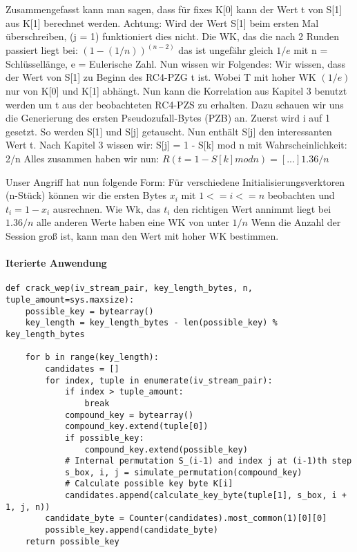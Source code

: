 \documentclass[10pt,a4paper]{article}
\begin{document}
Zusammengefasst kann man sagen, dass für fixes K[0] kann der Wert t von S[1] aus K[1] berechnet werden. Achtung: Wird der Wert S[1] beim ersten Mal überschreiben, (j = 1) funktioniert dies nicht. Die WK, das die nach 2 Runden passiert liegt bei:
$(1- (1/n))^(n-2)$ das ist ungefähr gleich $1/e$ mit n = Schlüssellänge, e = Eulerische Zahl. Nun wissen wir Folgendes: Wir wissen, dass der Wert von S[1] zu Beginn des RC4-PZG t ist. Wobei T mit hoher WK $(1/e)$ nur von K[0] und K[1] abhängt. Nun kann die Korrelation aus Kapitel 3 benutzt werden um t aus der beobachteten RC4-PZS zu erhalten. Dazu schauen wir uns die Generierung des ersten Pseudozufall-Bytes (PZB) an. Zuerst wird i auf 1 gesetzt. So werden S[1] und S[j] getauscht. Nun enthält S[j] den interessanten Wert t. Nach Kapitel 3 wissen wir: S[j] = 1 - S[k] mod n mit Wahrscheinlichkeit: 2/n Alles zusammen haben wir nun: $R( t = 1 - S[k] mod n) = [...] 1.36 /n$

Unser Angriff hat nun folgende Form: Für verschiedene Initialisierungsverktoren (n-Stück) können wir die ersten Bytes $x_i$ mit $1 <= i <= n$ beobachten und $t_i = 1 - x_i$ ausrechnen. Wie Wk, das $t_i$ den richtigen Wert annimmt liegt bei $1.36/n$ alle anderen Werte haben eine WK von unter $1/n$ Wenn die Anzahl der Session groß ist, kann man den Wert mit hoher WK bestimmen.
\paragraph{Iterierte Anwendung} 
\begin{lstlisting}
def crack_wep(iv_stream_pair, key_length_bytes, n, tuple_amount=sys.maxsize):
    possible_key = bytearray()
    key_length = key_length_bytes - len(possible_key) % key_length_bytes

    for b in range(key_length):
        candidates = []
        for index, tuple in enumerate(iv_stream_pair):
            if index > tuple_amount:
                break
            compound_key = bytearray()
            compound_key.extend(tuple[0])
            if possible_key:
                compound_key.extend(possible_key)
            # Internal permutation S_(i-1) and index j at (i-1)th step
            s_box, i, j = simulate_permutation(compound_key)
            # Calculate possible key byte K[i]
            candidates.append(calculate_key_byte(tuple[1], s_box, i + 1, j, n))
        candidate_byte = Counter(candidates).most_common(1)[0][0]
        possible_key.append(candidate_byte)
    return possible_key
\end{lstlisting}
\end{document}
